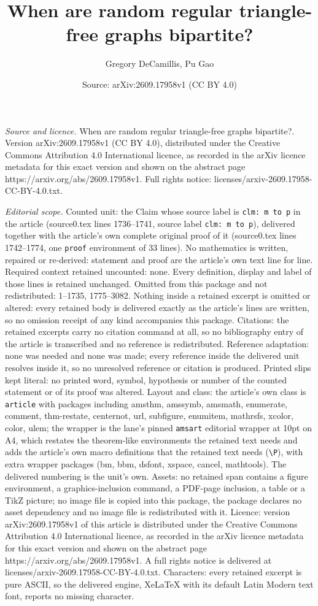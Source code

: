 \documentclass[10pt,a4paper]{amsart}
\title[When are random regular triangle-free graphs bipartite?]{When are random regular triangle-free graphs bipartite?}
\author{Gregory DeCamillis, Pu Gao}
\date{Source: arXiv:2609.17958v1 (CC BY 4.0)}
\begin{document}
\maketitle

\noindent\emph{Source and licence.} When are random regular triangle-free graphs bipartite?. Version arXiv:2609.17958v1 (CC BY 4.0), distributed under the Creative Commons Attribution 4.0 International licence, as recorded in the arXiv licence metadata for this exact version and shown on the abstract page https://arxiv.org/abs/2609.17958v1. Full rights notice: licenses/arxiv-2609.17958-CC-BY-4.0.txt.\par\smallskip

\noindent\textit{Editorial scope.} Counted unit: the Claim whose source label is \texttt{clm: m to p} in the article (source0.tex lines 1736--1741, source label \texttt{clm: m to p}), delivered together with the article's own complete original proof of it (source0.tex lines 1742--1774, one \texttt{proof} environment of 33 lines). No mathematics is written, repaired or re-derived: statement and proof are the article's own text line for line. Required context retained uncounted: none. Every definition, display and label of those lines is retained unchanged. Omitted from this package and not redistributed: 1--1735, 1775--3082. Nothing inside a retained excerpt is omitted or altered: every retained body is delivered exactly as the article's lines are written, so no omission receipt of any kind accompanies this package. Citations: the retained excerpts carry no citation command at all, so no bibliography entry of the article is transcribed and no reference is redistributed. Reference adaptation: none was needed and none was made; every reference inside the delivered unit resolves inside it, so no unresolved reference or citation is produced. Printed slips kept literal: no printed word, symbol, hypothesis or number of the counted statement or of its proof was altered. Layout and class: the article's own class is \texttt{article} with packages including amsthm, amssymb, amsmath, enumerate, comment, thm-restate, centernot, url, subfigure, enumitem, mathrsfs, xcolor, color, ulem; the wrapper is the lane's pinned \texttt{amsart} editorial wrapper at 10pt on A4, which restates the theorem-like environments the retained text needs and adds the article's own macro definitions that the retained text needs (\texttt{\textbackslash P}), with extra wrapper packages (bm, bbm, dsfont, xspace, cancel, mathtools). The delivered numbering is the unit's own. Assets: no retained span contains a figure environment, a graphics-inclusion command, a PDF-page inclusion, a table or a TikZ picture; no image file is copied into this package, the package declares no asset dependency and no image file is redistributed with it. Licence: version arXiv:2609.17958v1 of this article is distributed under the Creative Commons Attribution 4.0 International licence, as recorded in the arXiv licence metadata for this exact version and shown on the abstract page https://arxiv.org/abs/2609.17958v1. A full rights notice is delivered at licenses/arxiv-2609.17958-CC-BY-4.0.txt. Characters: every retained excerpt is pure ASCII, so the delivered engine, XeLaTeX with its default Latin Modern text font, reports no missing character.
\end{document}
